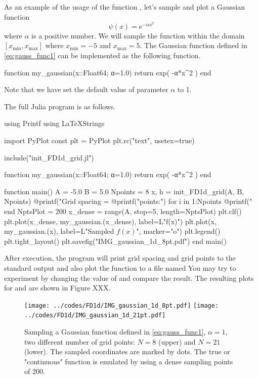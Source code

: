 As an example of the usage of the function , let's
sample and plot a Gaussian function
%
\begin{equation}
\psi(x) = \mathrm{e}^{-\alpha x^2}
\label{eq:gauss_func1}
\end{equation}
%
where $\alpha$ is a positive number. We will sample the function
within the domain $[x_{\text{min}},x_{\text{max}}]$ where
$x_{\text{min}}=-5$ and $x_{\text{max}}=5$.
The Gaussian function defined in \eqref{eq:gauss_func1} can be implemented
as the following function.
\begin{juliacode}
function my_gaussian(x::Float64; α=1.0)
    return exp( -α*x^2 )
end
\end{juliacode}
Note that we have set the default value of parameter $\alpha$ to 1.

The full Julia program is as follows.
%
\begin{juliacode}
using Printf
using LaTeXStrings

import PyPlot
const plt = PyPlot
plt.rc("text", usetex=true)

include("init_FD1d_grid.jl")

function my_gaussian(x::Float64; α=1.0)
    return exp( -α*x^2 )
end

function main()
    A = -5.0
    B =  5.0
    Npoints = 8
    x, h = init_FD1d_grid(A, B, Npoints)
    @printf("Grid spacing = %
    @printf("\nGrid points:\n")
    for i in 1:Npoints
        @printf("%
    end
    NptsPlot = 200
    x_dense = range(A, stop=5, length=NptsPlot)
    plt.clf()
    plt.plot(x_dense, my_gaussian.(x_dense),
        label=L"f(x)")
    plt.plot(x, my_gaussian.(x),
        label=L"Sampled $f(x)$", marker="o")
    plt.legend()
    plt.tight_layout()
    plt.savefig("IMG_gaussian_1d_8pt.pdf")
end
main()
\end{juliacode}

After execution, the program will print grid spacing and grid points to the standard
output and also plot the function to a file named 
You may try to experiment by changing the value of  and compare the result.
The resulting plots for  and  are shown in Figure XXX.
\begin{figure}[h]
{\center
\texttt{[image: ../codes/FD1d/IMG\_gaussian\_1d\_8pt.pdf]}
\texttt{[image: ../codes/FD1d/IMG\_gaussian\_1d\_21pt.pdf]}
\par}
\caption{Sampling a Gaussian function defined in \eqref{eq:gauss_func1}, $\alpha=1$,
two different number of grid points: $N=8$ (upper) and $N=21$ (lower). The sampled
coordinates are marked by dots. The true or "continuous" function is emulated by using
a dense sampling points of 200.}
\end{figure}

